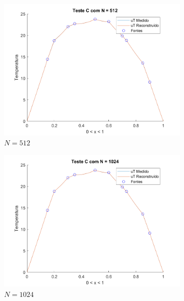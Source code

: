 \documentclass[12pt]{article}
\begin{document}
\begin{spacing}{1.5}
\begin{figure}[ht!]
    \begin{subfigure}[t]{.485\linewidth}
        \centering
        \includegraphics[width=1\linewidth]{Imagens/FigC512.png}
        \caption{$N=512$}
        \label{fig:testeC_512}
    \end{subfigure}
    \begin{subfigure}[t]{.485\linewidth}
        \centering
        \includegraphics[width=1\linewidth]{Imagens/FigC1024.png}
        \caption{$N=1024$}
        \label{fig:testeC_1024}
    \end{subfigure}
    \begin{subfigure}[t]{.485\linewidth}
        \centering

\end{subfigure}
\end{figure}
\end{spacing}
\end{document}

